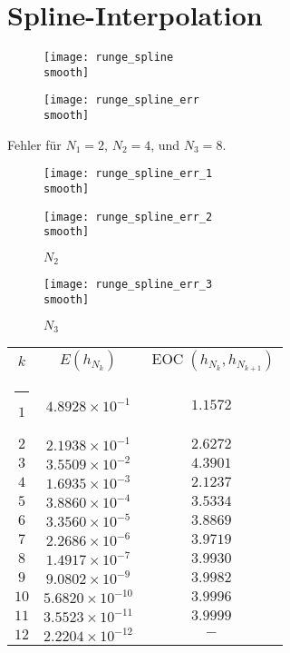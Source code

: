 \documentclass[]{scrartcl}
\makeatletter
\newcommand{\thickhline}{%
    \noalign {\ifnum 0=`}\fi \hrule height 1pt
    \futurelet \reserved@a \@xhline
}
\makeatother
\begin{document}
	\section{Spline-Interpolation}
	\begin{figure}[h]
		\centering
		\begin{minipage}{0.5\textwidth}
			\texttt{[image: runge\_spline\\smooth]}
			\caption{\label{Abb.5}}
		\end{minipage}
		\begin{minipage}{0.49\textwidth}
			\texttt{[image: runge\_spline\_err\\smooth]}
			\caption{\label{Abb.6}}
		\end{minipage}
	\end{figure}
	
	Fehler für $N_1=2$, $N_2=4$, und $N_3=8$.
	 \begin{figure}[h]
 		\centering
 		\begin{minipage}{0.5\textwidth}
 			\texttt{[image: runge\_spline\_err\_1\\smooth]}
 			\caption{$N_1$\label{Abb.7}}
 		\end{minipage}
 		\begin{minipage}{0.49\textwidth}
 			\texttt{[image: runge\_spline\_err\_2\\smooth]}
 			\caption{$N_2$\label{Abb.8}}
 		\end{minipage}
 	\end{figure}
 	
 	\begin{figure}[h]
 		\centering
		\texttt{[image: runge\_spline\_err\_3\\smooth]}
		\caption{$N_3$\label{Abb.9}}
 	\end{figure}
 	
 	\renewcommand{\arraystretch}{1.2}
 	\begin{tabular}{|c|c|c|}\hline
 	$k$  & $E(h_{N_k})$ & $\operatorname{EOC}(h_{N_k},h_{N_{k+1}})$\\\thickhline
 	$1$  & $4.8928\times10^{-1}$ & $1.1572$\\\hline
 	$2$  & $2.1938\times10^{-1}$ & $2.6272$\\\hline
 	$3$  & $3.5509\times10^{-2}$ & $4.3901$\\\hline
 	$4$  & $1.6935\times10^{-3}$ & $2.1237$\\\hline
 	$5$  & $3.8860\times10^{-4}$ & $3.5334$\\\hline
 	$6$  & $3.3560\times10^{-5}$ & $3.8869$\\\hline
 	$7$  & $2.2686\times10^{-6}$ & $3.9719$\\\hline
 	$8$  & $1.4917\times10^{-7}$ & $3.9930$\\\hline
 	$9$  & $9.0802\times10^{-9}$ & $3.9982$\\\hline
 	$10$ & $5.6820\times10^{-10}$ & $3.9996$\\\hline
 	$11$ & $3.5523\times10^{-11}$ & $3.9999$\\\hline
 	$12$ & $2.2204\times10^{-12}$ & $-$\\\hline
 	\end{tabular} 
\end{document}
